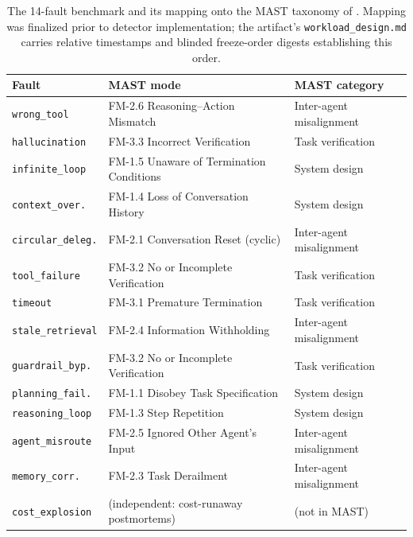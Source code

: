 \documentclass[a4paper,UKenglish,cleveref,autoref,thm-restate]{lipics-v2021}
\begin{document}
\begin{table}[t]
\centering
\footnotesize
\caption{The 14-fault benchmark and its mapping onto the MAST
taxonomy of \cite{anon-mast}.  Mapping was finalized prior to detector
implementation; the artifact's \texttt{workload\_design.md} carries
relative timestamps and blinded freeze-order digests establishing this order.}
\label{tab:mast}
\begin{tabular}{p{2.5cm}p{4.5cm}p{3cm}}
\toprule
\textbf{Fault} & \textbf{MAST mode} & \textbf{MAST category} \\
\midrule
\texttt{wrong\_tool}        & FM-2.6 Reasoning--Action Mismatch       & Inter-agent misalignment \\
\texttt{hallucination}      & FM-3.3 Incorrect Verification           & Task verification \\
\texttt{infinite\_loop}     & FM-1.5 Unaware of Termination Conditions& System design \\
\texttt{context\_over.}     & FM-1.4 Loss of Conversation History     & System design \\
\texttt{circular\_deleg.}   & FM-2.1 Conversation Reset (cyclic)      & Inter-agent misalignment \\
\texttt{tool\_failure}      & FM-3.2 No or Incomplete Verification    & Task verification \\
\texttt{timeout}            & FM-3.1 Premature Termination            & Task verification \\
\texttt{stale\_retrieval}   & FM-2.4 Information Withholding          & Inter-agent misalignment \\
\texttt{guardrail\_byp.}    & FM-3.2 No or Incomplete Verification    & Task verification \\
\texttt{planning\_fail.}    & FM-1.1 Disobey Task Specification       & System design \\
\texttt{reasoning\_loop}    & FM-1.3 Step Repetition                  & System design \\
\texttt{agent\_misroute}    & FM-2.5 Ignored Other Agent's Input      & Inter-agent misalignment \\
\texttt{memory\_corr.}      & FM-2.3 Task Derailment                  & Inter-agent misalignment \\
\texttt{cost\_explosion}    & (independent: cost-runaway postmortems) & (not in MAST) \\
\bottomrule
\end{tabular}
\end{table}
\end{document}
